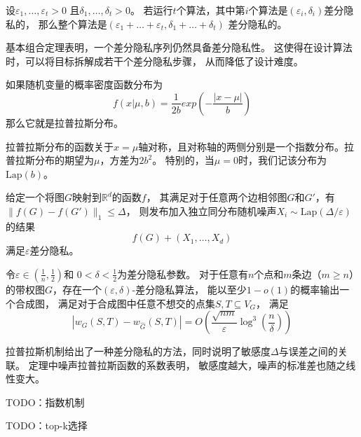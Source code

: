 \begin{theorem}[基本组合]\cite{dwork2006calibrating}\cite{dwork2009differential}
    设$\varepsilon_1,\ldots,\varepsilon_t > 0$
    且$\delta_1,\ldots,\delta_t > 0$。
    若运行$t$个算法，其中第$i$个算法是$(\varepsilon_i,\delta_i)$差分隐私的，
    那么整个算法是$(\varepsilon_1 + \ldots + \varepsilon_t,\delta_1 + \ldots + \delta_t)$
    差分隐私的。
\end{theorem}

基本组合定理表明，一个差分隐私序列仍然具备差分隐私性。
这使得在设计算法时，可以将目标拆解成若干个差分隐私步骤，
从而降低了设计难度。

\begin{definition}[拉普拉斯分布]
    如果随机变量的概率密度函数分布为
    \begin{equation*}
        f(x|\mu,b)=\frac 1{2b} exp\left(-\frac{|x-\mu|}b\right)
    \end{equation*}
    那么它就是拉普拉斯分布。
\end{definition}

拉普拉斯分布的函数关于$x=\mu$轴对称，且对称轴的两侧分别是一个指数分布。拉普拉斯分布的期望为$\mu$，方差为$2b^2$。
特别的，当$\mu=0$时，我们记该分布为$\text{Lap}(b)$。

\begin{theorem}[拉普拉斯机制]\cite{dwork2014algorithmic}
    给定一个将图$G$映射到$\mathbb{R}^d$的函数$f$，
    其满足对于任意两个边相邻图$G$和$G'$，有$\|f(G)-f(G')\|_1 \leq \Delta$，
    则发布加入独立同分布随机噪声$X_i \sim \text{Lap} (\Delta/\varepsilon)$的结果
    \begin{equation*}
        f(G)+(X_1,\ldots,X_d)
    \end{equation*}
    满足$\varepsilon$差分隐私。
\end{theorem}

\begin{theorem}[差分隐私图]\cite{liu2024almost}
    令$\varepsilon \in \left(\frac{1}{n}, \frac{1}{2}\right) $和 
    $ 0 < \delta < \frac{1}{2} $为差分隐私参数。
    对于任意有$n$个点和$m$条边（$m\geq n$）的带权图$G$，存在一个$(\varepsilon,\delta)$-差分隐私算法，
    能以至少$ 1 - o(1) $的概率输出一个合成图，
    满足对于合成图中任意不想交的点集$ S, T \subseteq V_G $，
    满足
    \begin{equation*}
        |w_G(S, T) - w_{\hat{G}}(S, T)| = O\left(\frac{\sqrt{nm}}{\varepsilon} \log^3 \left(\frac{n}{\delta}\right)\right)   
    \end{equation*}
    
\end{theorem}

拉普拉斯机制给出了一种差分隐私的方法，同时说明了敏感度$\Delta$与误差之间的关联。
定理中噪声拉普拉斯函数的系数表明，
敏感度越大，噪声的标准差也随之线性变大。

TODO：指数机制

TODO：top-k选择
